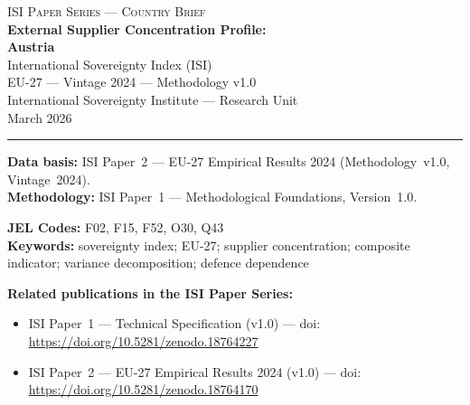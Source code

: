 \documentclass[12pt,a4paper]{article}
\begin{document}
\hypersetup{pageanchor=false}

\begin{titlepage}
\centering
\vspace*{2cm}
{\Large\textsc{ISI Paper Series --- Country Brief}}\\[1.2cm]
{\LARGE\bfseries External Supplier Concentration Profile:\\[0.3em]
Austria}\\[1.5cm]
{\large International Sovereignty Index (ISI)\\[0.3em]
EU-27 --- Vintage 2024 --- Methodology v1.0}\\[1.2cm]
{\large International Sovereignty Institute --- Research Unit}\\[0.8cm]
{\large March 2026}

\vspace{0.8cm}
\noindent\rule{\textwidth}{0.4pt}
\vspace{0.4cm}

\begin{flushleft}
\noindent\textbf{Data basis:} ISI Paper~2 --- EU-27 Empirical Results 2024 (Methodology~v1.0, Vintage~2024).\\[4pt]
\noindent\textbf{Methodology:} ISI Paper~1 --- Methodological Foundations, Version~1.0.

\medskip

\noindent\textbf{JEL Codes:} F02, F15, F52, O30, Q43\\[4pt]
\noindent\textbf{Keywords:} sovereignty index; EU-27; supplier concentration; composite indicator; variance decomposition; defence dependence

\medskip

\noindent\textbf{Related publications in the ISI Paper Series:}
\begin{itemize}[nosep,leftmargin=1.5em]
\item ISI Paper~1 --- Technical Specification (v1.0) --- doi:\\
  \url{https://doi.org/10.5281/zenodo.18764227}
\item ISI Paper~2 --- EU-27 Empirical Results 2024 (v1.0) --- doi:\\
  \url{https://doi.org/10.5281/zenodo.18764170}
\end{itemize}
\end{flushleft}
\vfill
\end{titlepage}
\end{document}
